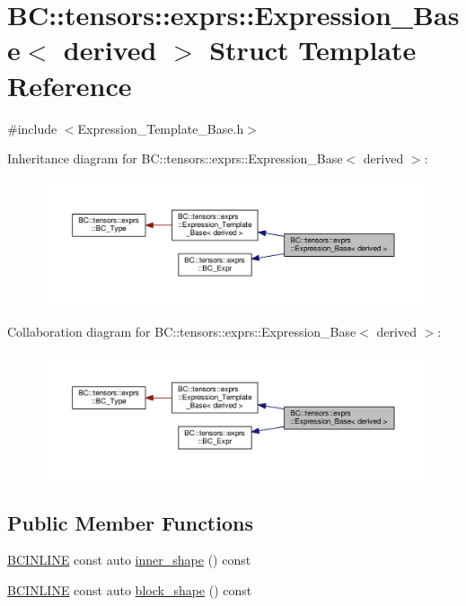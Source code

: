 \hypertarget{structBC_1_1tensors_1_1exprs_1_1Expression__Base}{}\section{BC\+:\+:tensors\+:\+:exprs\+:\+:Expression\+\_\+\+Base$<$ derived $>$ Struct Template Reference}
\label{structBC_1_1tensors_1_1exprs_1_1Expression__Base}


{\ttfamily \#include $<$Expression\+\_\+\+Template\+\_\+\+Base.\+h$>$}



Inheritance diagram for BC\+:\+:tensors\+:\+:exprs\+:\+:Expression\+\_\+\+Base$<$ derived $>$\+:
\nopagebreak
\begin{figure}[H]
\begin{center}
\leavevmode
\includegraphics[width=350pt]{structBC_1_1tensors_1_1exprs_1_1Expression__Base__inherit__graph}
\end{center}
\end{figure}


Collaboration diagram for BC\+:\+:tensors\+:\+:exprs\+:\+:Expression\+\_\+\+Base$<$ derived $>$\+:
\nopagebreak
\begin{figure}[H]
\begin{center}
\leavevmode
\includegraphics[width=350pt]{structBC_1_1tensors_1_1exprs_1_1Expression__Base__coll__graph}
\end{center}
\end{figure}
\subsection*{Public Member Functions}
\begin{DoxyCompactItemize}
\item 
\hyperlink{BlackCat__Common_8h_a6699e8b0449da5c0fafb878e59c1d4b1}{B\+C\+I\+N\+L\+I\+NE} const auto \hyperlink{structBC_1_1tensors_1_1exprs_1_1Expression__Base_a8d82476771899c59d4e9034f1a196cd2}{inner\+\_\+shape} () const 
\item 
\hyperlink{BlackCat__Common_8h_a6699e8b0449da5c0fafb878e59c1d4b1}{B\+C\+I\+N\+L\+I\+NE} const auto \hyperlink{structBC_1_1tensors_1_1exprs_1_1Expression__Base_af568fce10cb231e7cd87acc479e6f89d}{block\+\_\+shape} () const 
\end{DoxyCompactItemize}
